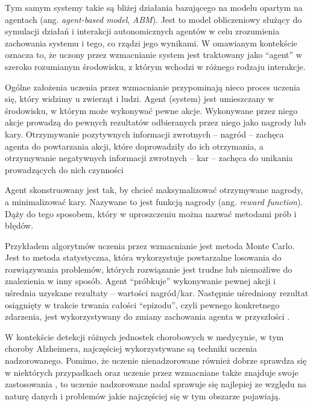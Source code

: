 \begin{itemize}
        Tym samym systemy takie są bliżej działania bazującego na modelu opartym na agentach (ang. \emph{agent-based model}, \emph{ABM}).
        Jest to model obliczeniowy służący do symulacji działań i interakcji autonomicznych agentów w celu zrozumienia zachowania systemu i tego, co rządzi jego wynikami.
        W omawianym kontekście oznacza to, że uczony przez wzmacnianie system jest traktowany jako ``agent'' w szeroko rozumianym środowisku, z którym wchodzi w różnego rodzaju interakcje.

        Ogólne założenia uczenia przez wzmacnianie przypominają nieco proces uczenia się, który widzimy u zwierząt i ludzi.
        Agent (system) jest umieszczany w środowisku, w którym może wykonywać pewne akcje.
        Wykonywane przez niego akcje prowadzą do pewnych rezultatów odbieranych przez niego jako nagrody lub kary.
        Otrzymywanie pozytywnych informacji zwrotnych -- nagród -- zachęca agenta do powtarzania akcji, które doprowadziły do ich otrzymania, a otrzymywanie negatywnych informacji zwrotnych -- kar -- zachęca do unikania prowadzących do nich czynności

        Agent skonstruowany jest tak, by chcieć maksymalizować otrzymywane nagrody, a minimalizować kary.
        Nazywane to jest funkcją nagrody (ang. \emph{reward function}).
        Dąży do tego sposobem, który w uproszczeniu można nazwać metodami prób i błędów.

        Przykładem algorytmów uczenia przez wzmacnianie jest metoda Monte Carlo.
        Jest to metoda statystyczna, która wykorzystuje powtarzalne losowania do rozwiązywania problemów, których rozwiązanie jest trudne lub niemożliwe do znalezienia w inny sposób.
        Agent ``próbkuje'' wykonywanie pewnej akcji i uśrednia uzyskane rezultaty -- wartości nagród/kar.
        Następnie uśredniony rezultat osiągnięty w trakcie trwania całości ``epizodu'', czyli pewnego konkretnego zdarzenia, jest wykorzystywany do zmiany zachowania agenta w przyszłości \cite{thrun2000reinforcement}.

\end{itemize}

W kontekście detekcji różnych jednostek chorobowych w medycynie, w tym choroby Alzheimera, najczęściej wykorzystywane są techniki uczenia nadzorowanego.
Pomimo, że uczenie nienadzorowane również dobrze sprawdza się w niektórych przypadkach \cite{raza2021tour} oraz uczenie przez wzmacniane także znajduje swoje zastosowania \cite{zhou2021deep}, to uczenie nadzorowane nadal sprawuje się najlepiej ze względu na naturę danych i problemów jakie najczęściej się w tym obszarze pojawiają.

